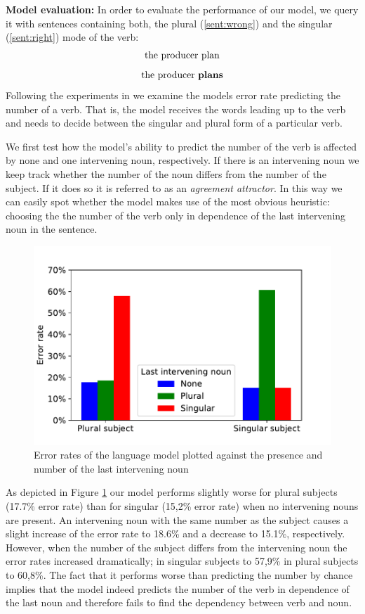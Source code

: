 \documentclass[11pt,a4paper]{article}
\begin{document}
\textbf{Model evaluation:} In order to evaluate the performance of our model, we query it with sentences containing both, the plural (\ref{sent:wrong}) and the singular (\ref{sent:right}) mode of the verb: 
\begin{align}
	\label{sent:wrong}
	\textnormal{the producer plan}
\end{align}
\begin{align}
	\label{sent:right}
	\textnormal{the producer  \textbf{plans}}
\end{align}
Following the experiments in \citep{Linzen2016} we examine the models error rate predicting the number of a verb. That is, the model receives the words leading up to the verb and needs to decide between the singular and plural form of a particular verb.

We first test how the model's ability to predict the number of the verb is affected by none and one intervening noun, respectively. If there is an intervening noun we keep track whether the number of the noun differs from the number of the subject. If it does so it is referred to as an \textit{agreement attractor}. In this way we can easily spot whether the model makes use of the most obvious heuristic: choosing the the number of the verb only in dependence of the last intervening noun in the sentence.
    \begin{figure}
    \centering
        \includegraphics[scale=0.5]{2b.pdf}
            	\caption{Error rates of the language model plotted against the presence and number of the last intervening noun}
        \label{fig:2b}
    \end{figure}
As depicted in Figure \ref{fig:2b} our model performs slightly worse for plural subjects (17.7\% error rate) than for singular (15,2\% error rate) when no intervening nouns are present. An intervening noun with the same number as the subject causes a slight increase of the error rate to 18.6\% and a decrease to 15.1\%, respectively. However, when the number of the subject differs from the intervening noun the error rates increased dramatically; in singular subjects to 57,9\% in plural subjects to 60,8\%. The fact that it performs worse than predicting the number by chance implies that the model indeed predicts the number of the verb in dependence of the last noun and therefore fails to find the dependency between verb and noun.
\end{document}
